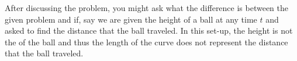 \documentclass[handout,instructornotes]{ximera}
\begin{document}
\begin{instructorNotes}
After discussing the problem, you might ask what the difference is between the given problem and if, say we are given the height of a ball at any time $t$ and asked to find the distance that the ball traveled.  
In this set-up, the height is not the  of the ball and thus the length of the curve does not represent the distance that the ball traveled.  
\end{instructorNotes}


















	
	
	
	
	
	
	
	
	

	










								
				
				
	
\end{document}
